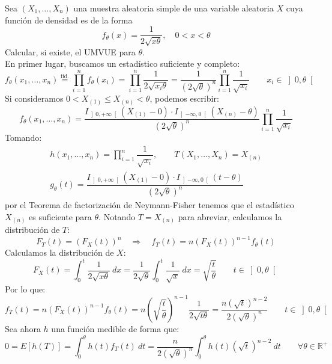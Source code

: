 \begin{ejercicio}
    Sea $(X_1, \ldots, X_n)$ una muestra aleatoria simple de una variable aleatoria $X$ cuya función de densidad es de la forma
    \begin{equation*}
        f_\theta(x) = \dfrac{1}{2\sqrt{x\theta}}, \quad 0<x<\theta
    \end{equation*}
    Calcular, si existe, el UMVUE para $\theta$.\\

    \noindent
    En primer lugar, buscamos un estadístico suficiente y completo:
    \begin{equation*}
        f_\theta(x_1, \ldots, x_n) \stackrel{\text{iid.}}{=} \prod_{i=1}^{n}f_\theta(x_i) = \prod_{i=1}^{n}\dfrac{1}{2\sqrt{x_i\theta}} = \dfrac{1}{{\left(2\sqrt{\theta}\right)}^{n}} \prod_{i=1}^{n} \frac{1}{\sqrt{x_i}} \qquad x_i \in \left]0,\theta\right[
    \end{equation*}
    Si consideramos $0< X_{(1)} \leq X_{(n)} < \theta $, podemos escribir:
    \begin{equation*}
        f_\theta(x_1, \ldots, x_n) = \dfrac{I_{\left]0,+\infty\right[}(X_{(1)}-0) \cdot I_{\left]-\infty,0\right[}(X_{(n)}-\theta)}{{\left(2\sqrt{\theta}\right)}^{n}} \prod_{i=1}^{n}\dfrac{1}{\sqrt{x_i}}
    \end{equation*}
    Tomando:
    \begin{gather*}
        h(x_1, \ldots, x_n) = \prod_{i=1}^{n}\dfrac{1}{\sqrt{x_i}}, \qquad T(X_1, \ldots, X_n) = X_{(n)} \\
        g_\theta(t) = \dfrac{I_{\left]0,+\infty\right[}(X_{(1)}-0) \cdot I_{\left]-\infty,0\right[}(t-\theta)}{{\left(2\sqrt{\theta}\right)}^{n}} 
    \end{gather*}
    por el Teorema de factorización de Neymann-Fisher tenemos que el estadístico $X_{(n)}$ es suficiente para $\theta$. Notando $T=X_{(n)}$ para abreviar, calculamos la distribución de $T$:
    \begin{equation*}
        F_T(t) = {(F_X(t))}^{n} \quad \Longrightarrow \quad  f_T(t) = n{(F_X(t))}^{n-1}f_\theta(t)
    \end{equation*}
    Calculamos la distribución de $X$:
    \begin{equation*}
        F_X(t) = \int_{0}^{t} \dfrac{1}{2\sqrt{x\theta}}~dx = \dfrac{1}{2\sqrt{\theta}}\int_{0}^{t} \dfrac{1}{\sqrt{x}}~dx  = \sqrt{\frac{t}{\theta}} \qquad t \in \left]0,\theta\right[
    \end{equation*}
    Por lo que:
    \begin{equation*}
        f_T(t) = n{(F_X(t))}^{n-1}f_\theta(t) = n{\left(\sqrt{\frac{t}{\theta}}\right)}^{n-1}\frac{1}{2\sqrt{t\theta}} = \dfrac{n{\left(\sqrt{t}\right)}^{n-2}}{2{\left(\sqrt{\theta}\right)}^{n}}\qquad t\in \left]0,\theta\right[
    \end{equation*}
    Sea ahora $h$ una función medible de forma que:
    \begin{equation*}
        0 = E[h(T)] = \int_{0}^{\theta} h(t) f_T(t)~dt = \frac{n}{2{\left(\sqrt{\theta}\right)}^{n}}\int_{0}^{\theta} h(t){\left(\sqrt{t}\right)}^{n-2}~dt  \qquad \forall \theta\in \mathbb{R}^+
    \end{equation*}


\end{ejercicio}
